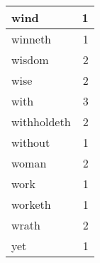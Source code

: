 \begin{center}
\begin{longtable}{l|r}
wind & 1\\ \hline 
winneth & 1\\ \hline 
wisdom & 2\\ \hline 
wise & 2\\ \hline 
with & 3\\ \hline 
withholdeth & 2\\ \hline 
without & 1\\ \hline 
woman & 2\\ \hline 
work & 1\\ \hline 
worketh & 1\\ \hline 
wrath & 2\\ \hline 
yet & 1\\ \hline 
\end{longtable}  
\end{center}  


  
\normalsize  

  
  
